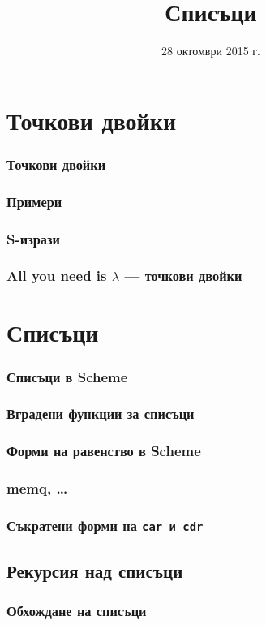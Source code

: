 \documentclass{beamer}
\title{Списъци}
\date{28 октомври 2015 г.}
\begin{document}
\begin{frame}
  \titlepage
\end{frame}

\section{Точкови двойки}

\begin{frame}
  \frametitle{Точкови двойки}
\end{frame}

\begin{frame}
  \frametitle{Примери}
\end{frame}

\begin{frame}
  \frametitle{S-изрази}
\end{frame}

\begin{frame}
  \frametitle{All you need is $\lambda$ --- точкови двойки}
\end{frame}

\section{Списъци}

\begin{frame}
  \frametitle{Списъци в Scheme}
\end{frame}

\begin{frame}
  \frametitle{Вградени функции за списъци}
\end{frame}

\begin{frame}
  \frametitle{Форми на равенство в Scheme}
\end{frame}

\begin{frame}
  \frametitle{memq, \ldots}
\end{frame}

\begin{frame}
  \frametitle{Съкратени форми на \tt{car} и \tt{cdr}}
\end{frame}


\subsection{Рекурсия над списъци}


\begin{frame}
  \frametitle{Обхождане на списъци}
\end{frame}
\end{document}
